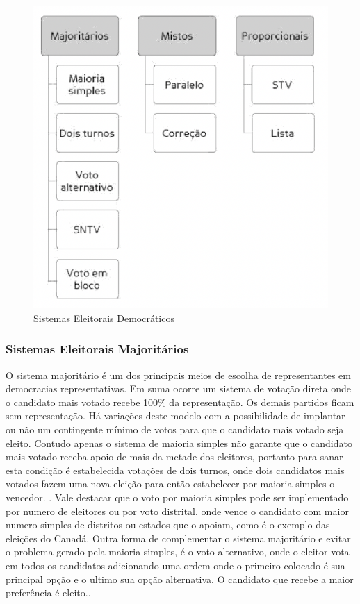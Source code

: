 \begin{figure}[htb]
	\caption{\label{exemplo}Sistemas Eleitorais Democráticos}
	\begin{center}
	\includegraphics[scale=0.7]{textual/sistemas-eleitorais.png}
	\end{center}
\end{figure} 
\subsubsection{Sistemas Eleitorais Majoritários}
O sistema majoritário é um dos principais meios de escolha de representantes em 
democracias representativas. Em suma ocorre um sistema de votação direta onde o
candidato mais votado recebe 100\% da representação. Os demais partidos ficam sem
representação. Há variações deste modelo com a possibilidade de implantar ou não 
um contingente mínimo de votos para que o candidato mais votado seja eleito. Contudo
apenas o sistema de maioria simples não garante que o candidato mais votado 
receba apoio de mais da metade dos eleitores, portanto para sanar esta condição
é estabelecida votações de dois turnos, onde dois
candidatos mais votados fazem uma nova eleição para então estabelecer por maioria
simples o vencedor. \cite[pág. 8]{nicolau2015sistemas}. Vale destacar que o voto por maioria
simples pode ser implementado por numero de eleitores ou por voto distrital, onde
vence o candidato com maior numero simples de distritos ou estados que o apoiam,
como é o exemplo das eleições do Canadá. Outra forma de complementar o sistema 
majoritário e evitar o problema gerado pela maioria simples, é o voto alternativo,
onde o eleitor vota em todos os candidatos adicionando uma ordem onde o primeiro 
colocado é sua principal opção e o ultimo sua opção alternativa. 
O candidato que recebe a maior preferência é eleito.\cite[pág. 7 - 16]{nicolau2015sistemas}.
